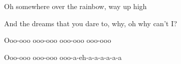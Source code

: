 \begin{song}
\bigskip

Oh somewhere over the rainbow,  way up high \par
{}And the dreams that you dare to, why, oh why can't I?  \par

\bigskip

Ooo-ooo  ooo-ooo  ooo-ooo  ooo-ooo \par
{}Ooo-ooo  ooo-ooo  ooo-a-eh-a-a-a-a-a-a \par


\end{song}
